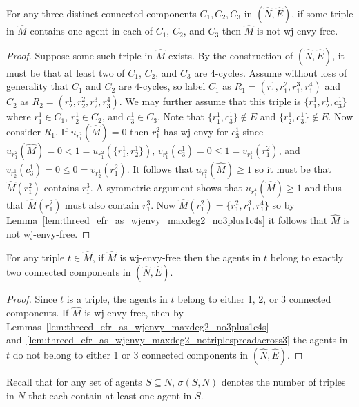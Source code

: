\begin{lem}
\label{lem:threed_efr_as_wjenvy_maxdeg2_notriplespreadacross3}
For any three distinct connected components $C_1, C_2, C_3$ in $(\hat{N}, \hat{E})$, if some triple in $\hat{M}$ contains one agent in each of $C_1$, $C_2$, and $C_3$ then $\hat{M}$ is not wj-envy-free.
\end{lem}
\begin{proof}
Suppose some such triple in $\hat{M}$ exists. By the construction of $(\hat{N}, \hat{E})$, it must be that at least two of $C_1$, $C_2$, and $C_3$ are $4$-cycles. Assume without loss of generality that $C_1$ and $C_2$ are $4$-cycles, so label $C_1$ as $R_1 = ( r_1^1, r_1^2, r_1^3, r_1^4 )$ and $C_2$ as $R_2 = ( r_2^1, r_2^2, r_2^3, r_3^4 )$. We may further assume that this triple is $\{ r_1^1, r_2^1, c_3^1 \}$ where $r_1^1 \in C_1$, $r_2^1 \in C_2$, and $c_3^1 \in C_3$. Note that $\{ r_1^1, c_3^1 \} \notin E$ and $\{ r_2^1, c_3^1 \} \notin E$. Now consider $R_1$. If $u_{r_1^2}(\hat{M}) = 0$ then $r_1^2$ has wj-envy for $c_3^1$ since $u_{r_1^2}(\hat{M}) = 0 < 1 = u_{r_1^2}(\{ r_1^1, r_2^1 \})$, $v_{r_1^1}(c_3^1) = 0 \leq 1 = v_{r_1^1}(r_1^2)$, and $v_{r_2^1}(c_3^1) = 0 \leq 0 = v_{r_2^1}(r_1^2)$. It follows that $u_{r_1^2}(\hat{M}) \geq 1$ so it must be that $\hat{M}(r_1^2)$ contains $r_1^3$. A symmetric argument shows that $u_{r_1^4}(\hat{M}) \geq 1$ and thus that $\hat{M}(r_1^2)$ must also contain $r_1^3$. Now $\hat{M}(r_1^2) = \{ r_1^2, r_1^3, r_1^4 \}$ so by Lemma~\ref{lem:threed_efr_as_wjenvy_maxdeg2_no3plus1c4s} it follows that $\hat{M}$ is not wj-envy-free. 
\end{proof}

\begin{lem}
\label{lem:threed_efr_as_wjenvy_maxdeg2_tripletouches2components}
For any triple $t \in \hat{M}$, if $\hat{M}$ is wj-envy-free then the agents in $t$ belong to exactly two connected components in $(\hat{N}, \hat{E})$.
\end{lem}
\begin{proof}
Since $t$ is a triple, the agents in $t$ belong to either 1, 2, or 3 connected components. If $\hat{M}$ is wj-envy-free, then by Lemmas~\ref{lem:threed_efr_as_wjenvy_maxdeg2_no3plus1c4s} and~\ref{lem:threed_efr_as_wjenvy_maxdeg2_notriplespreadacross3} the agents in $t$ do not belong to either 1 or 3 connected components in $(\hat{N}, \hat{E})$.
\end{proof}

Recall that for any set of agents $S \subseteq N$, $\sigma(S, N)$ denotes the number of triples in $N$ that each contain at least one agent in $S$.

